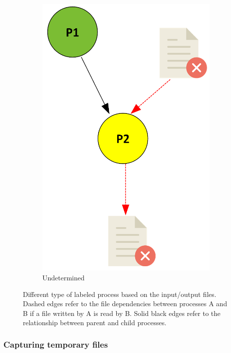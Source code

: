 \documentclass[a4paper,num-refs]{oup-contemporary}
\begin{document}
\begin{figure}
\begin{subfigure}{0.2\linewidth}
    \includegraphics[scale=0.3]{images/yellow.png}
    \caption{Undetermined}
    \label{fig:yellow}
\end{subfigure}
    \caption{Different type of labeled process based on the input/output files.
  Dashed edges refer to the file dependencies between processes A and B 
  if a file written by A is read by B. Solid black edges refer to the 
  relationship between parent and child processes.}
    \label{fig:processes}
\end{figure}

\subsubsection{Capturing temporary files} 
\end{document}
